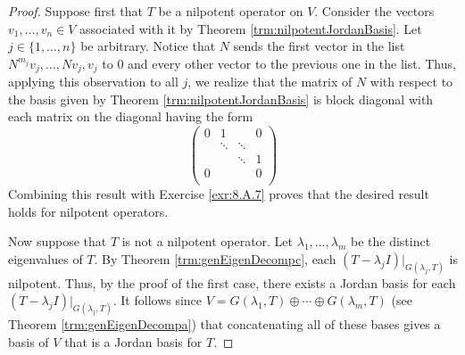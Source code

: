 \documentclass[../main.tex]{subfiles}
\begin{document}
\begin{itemize}
\begin{theorem}
\begin{proof}
            Suppose first that $T$ be a nilpotent operator on $V$. Consider the vectors $v_1,\dots,v_n\in V$ associated with it by Theorem \ref{trm:nilpotentJordanBasis}. Let $j\in\{1,\dots,n\}$ be arbitrary. Notice that $N$ sends the first vector in the list $N^{m_j}v_j,\dots,Nv_j,v_j$ to 0 and every other vector to the previous one in the list. Thus, applying this observation to all $j$, we realize that the matrix of $N$ with respect to the basis given by Theorem \ref{trm:nilpotentJordanBasis} is block diagonal with each matrix on the diagonal having the form
            \begin{equation*}
                \begin{pmatrix}
                    0 & 1 &  & 0\\
                     & \ddots & \ddots & \\
                     &  & \ddots & 1\\
                    0 &  &  & 0\\
                \end{pmatrix}
            \end{equation*}
            Combining this result with Exercise \ref{exr:8.A.7} proves that the desired result holds for nilpotent operators.\par
            Now suppose that $T$ is not a nilpotent operator. Let $\lambda_1,\dots,\lambda_m$ be the distinct eigenvalues of $T$. By Theorem \ref{trm:genEigenDecompc}, each $(T-\lambda_jI)|_{G(\lambda_j,T)}$ is nilpotent. Thus, by the proof of the first case, there exists a Jordan basis for each $(T-\lambda_jI)|_{G(\lambda_j,T)}$. It follows since $V=G(\lambda_1,T)\oplus\cdots\oplus G(\lambda_m,T)$ (see Theorem \ref{trm:genEigenDecompa}) that concatenating all of these bases gives a basis of $V$ that is a Jordan basis for $T$.
        \end{proof}
    \end{theorem}
\end{itemize}
\end{document}

